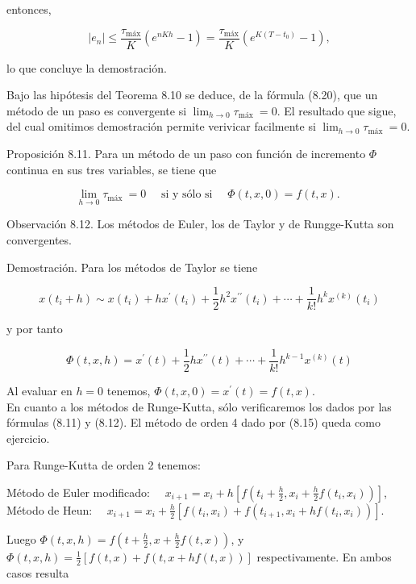 \documentclass[10pt]{article}
\begin{document}
entonces,

$$
\left|e_{n}\right| \leq \frac{\tau_{\operatorname{máx}}}{K}\left(e^{n K h}-1\right)=\frac{\tau_{\operatorname{máx}}}{K}\left(e^{K\left(T-t_{0}\right)}-1\right),
$$

lo que concluye la demostración.

Bajo las hipótesis del Teorema 8.10 se deduce, de la fórmula (8.20), que un método de un paso es convergente si $\lim _{h \rightarrow 0} \tau_{\text {máx }}=0$. El resultado que sigue, del cual omitimos demostración permite verivicar facilmente si $\lim _{h \rightarrow 0} \tau_{\text {máx }}=0$.

Proposición 8.11. Para un método de un paso con función de incremento $\Phi$ continua en sus tres variables, se tiene que

$$
\lim _{h \rightarrow 0} \tau_{\text {máx }}=0 \quad \text { si y sólo si } \quad \Phi(t, x, 0)=f(t, x) \text {. }
$$

Observación 8.12. Los métodos de Euler, los de Taylor y de Rungge-Kutta son convergentes.

Demostración. Para los métodos de Taylor se tiene

$$
x\left(t_{i}+h\right) \sim x\left(t_{i}\right)+h x^{\prime}\left(t_{i}\right)+\frac{1}{2} h^{2} x^{\prime \prime}\left(t_{i}\right)+\cdots+\frac{1}{k!} h^{k} x^{(k)}\left(t_{i}\right)
$$

y por tanto

$$
\Phi(t, x, h)=x^{\prime}(t)+\frac{1}{2} h x^{\prime \prime}(t)+\cdots+\frac{1}{k!} h^{k-1} x^{(k)}(t)
$$

Al evaluar en $h=0$ tenemos, $\Phi(t, x, 0)=x^{\prime}(t)=f(t, x)$.\\
En cuanto a los métodos de Runge-Kutta, sólo verificaremos los dados por las fórmulas (8.11) y (8.12). El método de orden 4 dado por (8.15) queda como ejercicio.

Para Runge-Kutta de orden 2 tenemos:

Método de Euler modificado: $\quad x_{i+1}=x_{i}+h\left[f\left(t_{i}+\frac{h}{2}, x_{i}+\frac{h}{2} f\left(t_{i}, x_{i}\right)\right)\right]$,\\
Método de Heun: $\quad x_{i+1}=x_{i}+\frac{h}{2}\left[f\left(t_{i}, x_{i}\right)+f\left(t_{i+1}, x_{i}+h f\left(t_{i}, x_{i}\right)\right)\right]$.

Luego $\Phi(t, x, h)=f\left(t+\frac{h}{2}, x+\frac{h}{2} f(t, x)\right)$, y $\Phi(t, x, h)=\frac{1}{2}[f(t, x)+f(t, x+h f(t, x))]$ respectivamente. En ambos casos resulta
\end{document}
